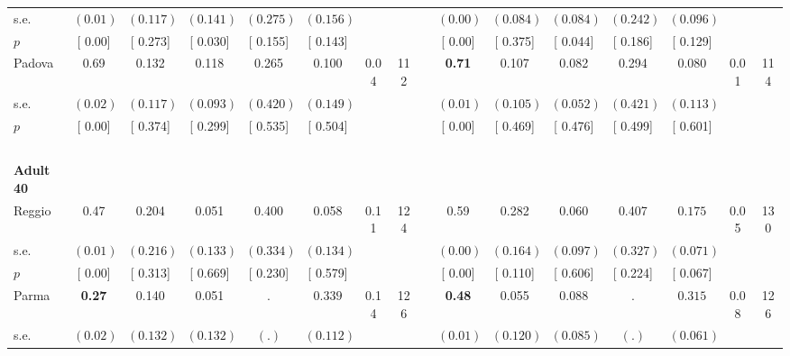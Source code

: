\begin{longtable}{L{8em} c c c c c c c p{1em} c c c c c c c}
\quad \quad \quad \quad s.e.& $ (     0.01)$ & $ (    0.117)$ & $ (    0.141)$ & $ (    0.275)$ & $ (    0.156)$ & & & & $ (     0.00)$ & $ (    0.084)$ & $ (    0.084)$ & $ (    0.242)$ & $ (    0.096)$ & &  \\*
\quad \quad \quad \quad $ p$ & [     0.00] & [    0.273] & [    0.030] & [    0.155] & [    0.143] & & & & [     0.00] & [    0.375] & [    0.044] & [    0.186] & [    0.129] & &  \\[1em]
\quad \quad \quad Padova& 0.69 &     0.132 &     0.118 &     0.265 &     0.100 &      0.04 &       112 & & \textbf{     0.71} &     0.107 &     0.082 &     0.294 &     0.080 &      0.01 &       114  \\*
\quad \quad \quad \quad s.e.& $ (     0.02)$ & $ (    0.117)$ & $ (    0.093)$ & $ (    0.420)$ & $ (    0.149)$ & & & & $ (     0.01)$ & $ (    0.105)$ & $ (    0.052)$ & $ (    0.421)$ & $ (    0.113)$ & &  \\*
\quad \quad \quad \quad $ p$ & [     0.00] & [    0.374] & [    0.299] & [    0.535] & [    0.504] & & & & [     0.00] & [    0.469] & [    0.476] & [    0.499] & [    0.601] & &  \\[1em]
~\\[1em]
\quad \quad \textbf{Adult 40} & & & & & & & & & & & & & & & \\* 
\quad \quad \quad Reggio& 0.47 &     0.204 &     0.051 &     0.400 &     0.058 &      0.11 &       124 & & 0.59 &     0.282 &     0.060 &     0.407 & $ \mathbf{    0.175}$ &      0.05 &       130  \\*
\quad \quad \quad \quad s.e.& $ (     0.01)$ & $ (    0.216)$ & $ (    0.133)$ & $ (    0.334)$ & $ (    0.134)$ & & & & $ (     0.00)$ & $ (    0.164)$ & $ (    0.097)$ & $ (    0.327)$ & $ (    0.071)$ & &  \\*
\quad \quad \quad \quad $ p$ & [     0.00] & [    0.313] & [    0.669] & [    0.230] & [    0.579] & & & & [     0.00] & [    0.110] & [    0.606] & [    0.224] & [    0.067] & &  \\[1em]
\quad \quad \quad Parma& \textbf{     0.27} &     0.140 &     0.051 &         . & $ \mathbf{    0.339}$ &      0.14 &       126 & & \textbf{     0.48} &     0.055 &     0.088 &         . & $ \mathbf{    0.315}$ &      0.08 &       126  \\*
\quad \quad \quad \quad s.e.& $ (     0.02)$ & $ (    0.132)$ & $ (    0.132)$ & $ (        .)$ & $ (    0.112)$ & & & & $ (     0.01)$ & $ (    0.120)$ & $ (    0.085)$ & $ (        .)$ & $ (    0.061)$ & &  \\*

\end{longtable}
